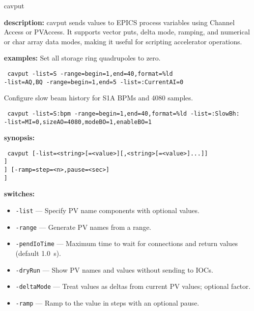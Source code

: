 \begin{sddsprog}{cavput}
  \item \textbf{description:}
    cavput sends values to EPICS process variables using Channel Access or PVAccess. It supports vector puts, delta mode, ramping, and numerical or char array data modes, making it useful for scripting accelerator operations.
  \item \textbf{examples:}
    Set all storage ring quadrupoles to zero.
    \begin{flushleft}{\tt
    cavput -list=S -range=begin=1,end=40,format=\%ld\\
      -list=AQ,BQ -range=begin=1,end=5 -list=:CurrentAI=0
    }\end{flushleft}
    Configure slow beam history for S1A BPMs and 4080 samples.
    \begin{flushleft}{\tt
    cavput -list=S:bpm -range=begin=1,end=40,format=\%ld -list=:SlowBh:\\
      -list=MI=0,sizeAO=4080,modeBO=1,enableBO=1
    }\end{flushleft}
  \item \textbf{synopsis:}
    \begin{flushleft}{\tt
    cavput [-list=<string>[=<value>][,<string>[=<value>]...]]\\\relax
      [-range=begin=<integer>,end=<integer>[,format=<string>][,interval=<integer>]]\\\relax
      [-pendIoTime=<seconds>] [-dryRun] [-deltaMode[=factor=<value>]] [-ramp=step=<n>,pause=<sec>]\\\relax
      [-numerical] [-charArray] [-blunderAhead[=silently]]\\\relax
      [-provider=\{ca|pva\}]
    }\end{flushleft}
  \item \textbf{switches:}
    \begin{itemize}
      \item {\tt -list} --- Specify PV name components with optional values.
      \item {\tt -range} --- Generate PV names from a range.
      \item {\tt -pendIoTime} --- Maximum time to wait for connections and return values (default 1.0~s).
      \item {\tt -dryRun} --- Show PV names and values without sending to IOCs.
      \item {\tt -deltaMode} --- Treat values as deltas from current PV values; optional factor.
      \item {\tt -ramp} --- Ramp to the value in steps with an optional pause.

\end{itemize}
\end{sddsprog}
